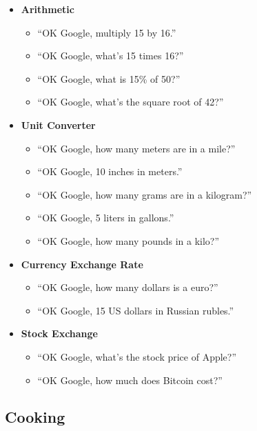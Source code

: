 \documentclass[
  jou,
  floatsintext,
  longtable,
  a4paper,
  nolmodern,
  notxfonts,
  notimes,
  12pt,
  colorlinks=true,linkcolor=blue,citecolor=blue,urlcolor=blue]{apa7}
\providecommand{\tightlist}{%
  \setlength{\itemsep}{0pt}\setlength{\parskip}{0pt}}
\begin{document}
\begin{itemize}
\tightlist
\item
  \textbf{Arithmetic}

  \begin{itemize}
  \tightlist
  \item
    ``OK Google, multiply 15 by 16.''
  \item
    ``OK Google, what's 15 times 16?''
  \item
    ``OK Google, what is 15\% of 50?''
  \item
    ``OK Google, what's the square root of 42?''
  \end{itemize}
\item
  \textbf{Unit Converter}

  \begin{itemize}
  \tightlist
  \item
    ``OK Google, how many meters are in a mile?''
  \item
    ``OK Google, 10 inches in meters.''
  \item
    ``OK Google, how many grams are in a kilogram?''
  \item
    ``OK Google, 5 liters in gallons.''
  \item
    ``OK Google, how many pounds in a kilo?''
  \end{itemize}
\item
  \textbf{Currency Exchange Rate}

  \begin{itemize}
  \tightlist
  \item
    ``OK Google, how many dollars is a euro?''
  \item
    ``OK Google, 15 US dollars in Russian rubles.''
  \end{itemize}
\item
  \textbf{Stock Exchange}

  \begin{itemize}
  \tightlist
  \item
    ``OK Google, what's the stock price of Apple?''
  \item
    ``OK Google, how much does Bitcoin cost?''
  \end{itemize}
\end{itemize}

\subsection{Cooking}\label{cooking}
\end{document}
